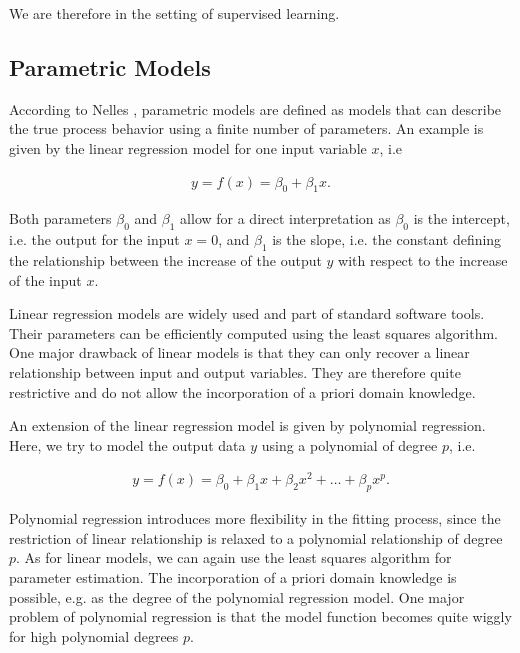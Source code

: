 \documentclass[10pt,a4paper]{article}
\begin{document}
We are therefore in the setting of supervised learning. 

\subsection{Parametric Models}

According to Nelles \cite{nelles2013nonlinear}, parametric models are defined as models that can describe the true process behavior using a finite number of parameters. An example is given by the linear regression model for one input variable $x$, i.e

\begin{align} \label{eq:classical-linear-model}
	y= f(x) = \beta_0 + \beta_1 x.
\end{align}

Both parameters $\beta_0$ and $\beta_1$ allow for a direct interpretation as $\beta_0$ is the intercept, i.e. the output for the input $x=0$, and $\beta_1$ is the slope, i.e. the constant defining the relationship between the increase of the output $y$ with respect to the increase of the input $x$.  

Linear regression models are widely used and part of standard software tools. Their parameters can be efficiently computed using the least squares algorithm. One major drawback of linear models is that they can only recover a linear relationship between input and output variables. They are therefore quite restrictive and do not allow the incorporation of a priori domain knowledge. 

An extension of the linear regression model is given by polynomial regression. Here, we try to model the output data $y$ using a polynomial of degree $p$, i.e.

\begin{align} \label{eq:polynomial-model}
	y = f(x) = \beta_0 + \beta_1 x + \beta_2 x^2 + \dots + \beta_p x^p.
\end{align}

Polynomial regression introduces more flexibility in the fitting process, since the restriction of linear relationship is relaxed to a polynomial relationship of degree $p$. As for linear models, we can again use the least squares algorithm for parameter estimation. The incorporation of a priori domain knowledge is possible, e.g. as the degree of the polynomial regression model. One major problem of polynomial regression is that the model function becomes quite wiggly for high polynomial degrees $p$. 
\end{document}
